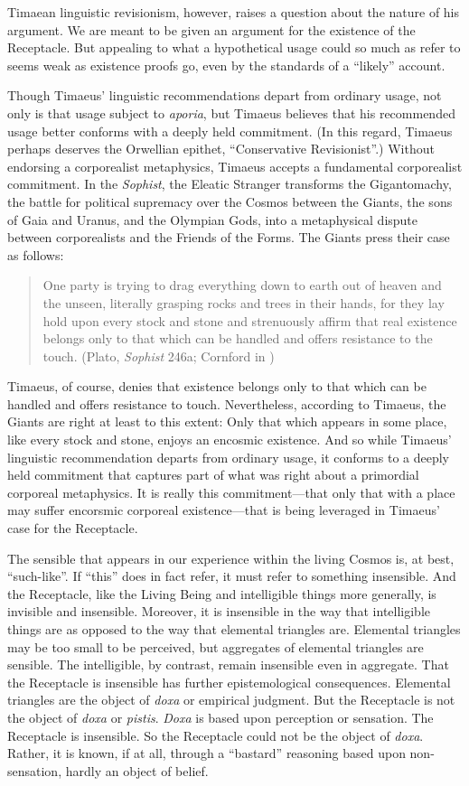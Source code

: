 Timaean linguistic revisionism, however, raises a question about the nature of his argument. We are meant to be given an argument for the existence of the Receptacle. But appealing to what a hypothetical usage could so much as refer to seems weak as existence proofs go, even by the standards of a ``likely'' account. 

Though Timaeus' linguistic recommendations depart from ordinary usage, not only is that usage subject to \emph{aporia}, but Timaeus believes that his recommended usage better conforms with a deeply held commitment. (In this regard, Timaeus perhaps deserves the Orwellian epithet, ``Conservative Revisionist''.) Without endorsing a corporealist metaphysics, Timaeus accepts a fundamental corporealist commitment. In the \emph{Sophist}, the Eleatic Stranger transforms the Gigantomachy, the battle for political supremacy over the Cosmos between the Giants, the sons of Gaia and Uranus, and the Olympian Gods, into a metaphysical dispute between corporealists and the Friends of the Forms. The Giants press their case as follows:
\begin{quote}
	One party is trying to drag everything down to earth out of heaven and the unseen, literally grasping rocks and trees in their hands, for they lay hold upon every stock and stone and strenuously affirm that real existence belongs only to that which can be handled and offers resistance to the touch. (Plato, \emph{Sophist} 246a; Cornford in \citealt{Hamilton:1989fk})
\end{quote}
Timaeus, of course, denies that existence belongs only to that which can be handled and offers resistance to touch. Nevertheless, according to Timaeus, the Giants are right at least to this extent: Only that which appears in some place, like every stock and stone, enjoys an encosmic existence. And so while Timaeus' linguistic recommendation departs from ordinary usage, it conforms to a deeply held commitment that captures part of what was right about a primordial corporeal metaphysics. It is really this commitment---that only that with a place may suffer encorsmic corporeal existence---that is being leveraged in Timaeus' case for the Receptacle.

The sensible that appears in our experience within the living Cosmos is, at best, ``such-like''. If ``this'' does in fact refer, it must refer to something insensible. And the Receptacle, like the Living Being and intelligible things more generally, is invisible and insensible. Moreover, it is insensible in the way that intelligible things are as opposed to the way that elemental triangles are. Elemental triangles may be too small to be perceived, but aggregates of elemental triangles are sensible. The intelligible, by contrast, remain insensible even in aggregate. That the Receptacle is insensible has further epistemological consequences. Elemental triangles are the object of \emph{doxa} or empirical judgment. But the Receptacle is not the object of \emph{doxa} or \emph{pistis}. \emph{Doxa} is based upon perception or sensation. The Receptacle is insensible. So the Receptacle could not be the object of \emph{doxa}. Rather, it is known, if at all, through a ``bastard'' reasoning based upon non-sensation, hardly an object of belief.

